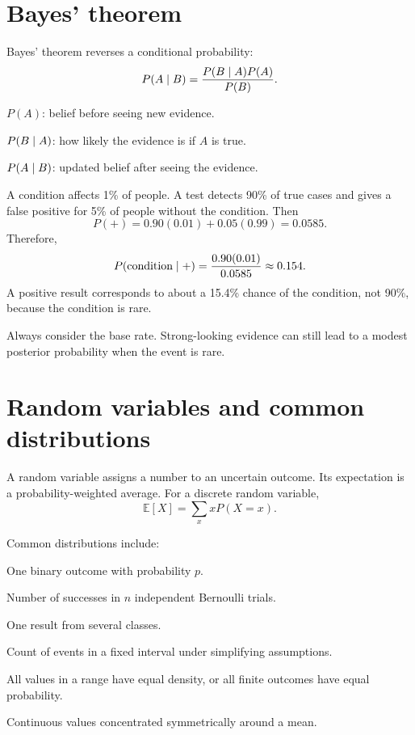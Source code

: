 \section{Bayes' theorem}

Bayes' theorem reverses a conditional probability:
\[
  P(A\mathrel{|} B)=\frac{P(B\mathrel{|} A)P(A)}{P(B)}.
\]

\begin{description}[leftmargin=1.15in,style=nextline]
  \item[Prior] $P(A)$: belief before seeing new evidence.
  \item[Likelihood] $P(B\mathrel{|} A)$: how likely the evidence is if $A$ is true.
  \item[Posterior] $P(A\mathrel{|} B)$: updated belief after seeing the evidence.
\end{description}

\begin{workedexample}
A condition affects 1\% of people. A test detects 90\% of true cases and gives a false positive for 5\% of people without the condition. Then
\[
P(+)=0.90(0.01)+0.05(0.99)=0.0585.
\]
Therefore,
\[
P(\text{condition}\mathrel{|} +)=\frac{0.90(0.01)}{0.0585}\approx0.154.
\]
A positive result corresponds to about a 15.4\% chance of the condition, not 90\%, because the condition is rare.
\end{workedexample}

\begin{keyidea}
Always consider the base rate. Strong-looking evidence can still lead to a modest posterior probability when the event is rare.
\end{keyidea}

\section{Random variables and common distributions}

A random variable assigns a number to an uncertain outcome. Its expectation is a probability-weighted average. For a discrete random variable,
\[
  \mathbb{E}[X]=\sum_x xP(X=x).
\]

Common distributions include:

\begin{description}[leftmargin=1.25in,style=nextline]
  \item[Bernoulli] One binary outcome with probability $p$.
  \item[Binomial] Number of successes in $n$ independent Bernoulli trials.
  \item[Categorical] One result from several classes.
  \item[Poisson] Count of events in a fixed interval under simplifying assumptions.
  \item[Uniform] All values in a range have equal density, or all finite outcomes have equal probability.
  \item[Normal] Continuous values concentrated symmetrically around a mean.
\end{description}

